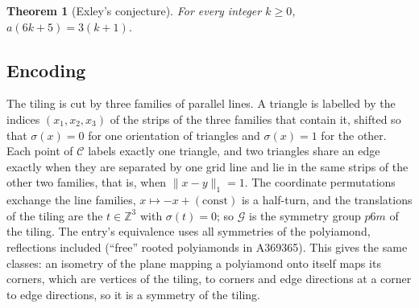 \documentclass[11pt]{amsart}
\theoremstyle{plain}
\newtheorem{theorem}{Theorem}
\theoremstyle{definition}
\newcommand{\Z}{\mathbb{Z}}
\newcommand{\C}{\mathcal{C}}
\newcommand{\G}{\mathcal{G}}
\begin{document}
\begin{theorem}[Exley's conjecture]\label{thm:main}
For every integer $k\ge0$, $a(6k+5)=3(k+1)$.
\end{theorem}

\subsection*{Encoding}
The tiling is cut by three families of parallel lines. A triangle is labelled by the indices $(x_1,x_2,x_3)$ of the strips of the three families that contain it, shifted so that $\sigma(x)=0$ for one orientation of triangles and $\sigma(x)=1$ for the other. Each point of $\C$ labels exactly one triangle, and two triangles share an edge exactly when they are separated by one grid line and lie in the same strips of the other two families, that is, when $\|x-y\|_1=1$. The coordinate permutations exchange the line families, $x\mapsto -x+(\text{const})$ is a half-turn, and the translations of the tiling are the $t\in\Z^3$ with $\sigma(t)=0$; so $\G$ is the symmetry group $p6m$ of the tiling. The entry's equivalence uses all symmetries of the polyiamond, reflections included (``free'' rooted polyiamonds in A369365). This gives the same classes: an isometry of the plane mapping a polyiamond onto itself maps its corners, which are vertices of the tiling, to corners and edge directions at a corner to edge directions, so it is a symmetry of the tiling.
\end{document}
